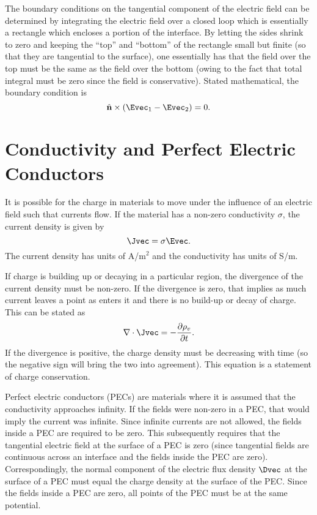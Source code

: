 The boundary conditions on the tangential component of the electric
field can be determined by integrating the electric field over a
closed loop which is essentially a rectangle which encloses a portion
of the interface.  By letting the sides shrink to zero and keeping the
``top'' and ``bottom'' of the rectangle small but finite (so that they
are tangential to the surface), one essentially has that the field
over the top must be the same as the field over the bottom (owing to
the fact that total integral must be zero since the field is
conservative).  Stated mathematical, the boundary condition is
\begin{equation}
 \hat{\mathbf{n}} \times (\Evec_1 - \Evec_2) = 0.
\end{equation}

\section{Conductivity and Perfect Electric Conductors}

It is possible for the charge in materials to move under the influence
of an electric field such that currents flow.  If the material has a
non-zero conductivity $\sigma$, the current density is given by
\begin{equation}
  \Jvec = \sigma \Evec.
\end{equation}
The current density has units of A/m$^2$ and the conductivity has
units of S/m.

If charge is building up or decaying in a particular region, the
divergence of the current density must be non-zero.  If the divergence
is zero, that implies as much current leaves a point as enters it and
there is no build-up or decay of charge.  This can be stated as
\begin{equation}
  \nabla \cdot \Jvec = -\frac{\partial \rho_v}{\partial t}.
  \label{eq:chargeConservation}
\end{equation}
If the divergence is positive, the charge density must be decreasing
with time (so the negative sign will bring the two into agreement).
This equation is a statement of charge conservation.

Perfect electric conductors (PECs) are materials where it is assumed
that the conductivity approaches infinity.  If the fields were
non-zero in a PEC, that would imply the current was infinite.  Since
infinite currents are not allowed, the fields inside a PEC are
required to be zero.  This subsequently requires that the tangential
electric field at the surface of a PEC is zero (since tangential
fields are continuous across an interface and the fields inside the
PEC are zero).  Correspondingly, the normal component of the electric
flux density $\Dvec$ at the surface of a PEC must equal the charge
density at the surface of the PEC.  Since the fields inside a PEC are
zero, all points of the PEC must be at the same potential.

